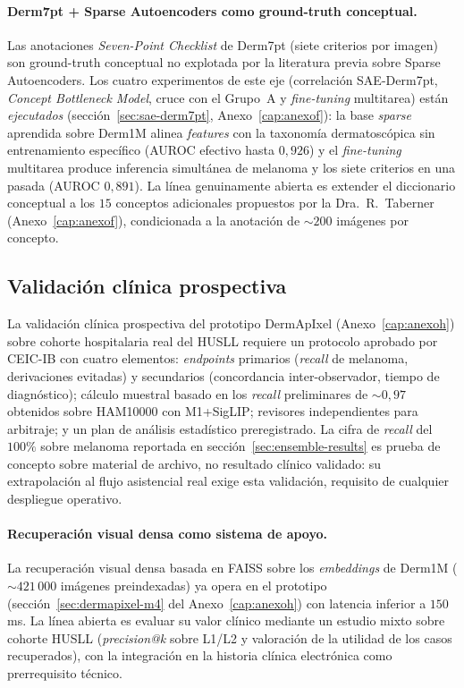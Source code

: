 \paragraph{Derm7pt + Sparse Autoencoders como ground-truth conceptual.}
\label{sec:linea-derm7pt-sae}
Las anotaciones \emph{Seven-Point Checklist} de Derm7pt (siete criterios
por imagen) son ground-truth conceptual no explotada por la literatura
previa sobre Sparse Autoencoders. Los cuatro experimentos de este eje
(correlación SAE-Derm7pt, \emph{Concept Bottleneck Model}, cruce con el
Grupo~A y \emph{fine-tuning} multitarea) están \emph{ejecutados}
(sección~\ref{sec:sae-derm7pt}, Anexo~\ref{cap:anexof}): la base
\emph{sparse} aprendida sobre Derm1M alinea \emph{features} con la
taxonomía dermatoscópica sin entrenamiento específico (AUROC efectivo
hasta $0{,}926$) y el \emph{fine-tuning} multitarea produce inferencia
simultánea de melanoma y los siete criterios en una pasada (AUROC
$0{,}891$). La línea genuinamente abierta es extender el diccionario
conceptual a los $15$ conceptos adicionales propuestos por la
Dra.~R.~Taberner (Anexo~\ref{cap:anexof}), condicionada a la anotación de
$\sim 200$ imágenes por concepto.

\subsection{Validación clínica prospectiva}
\label{sec:linea-prospectivo}

La validación clínica prospectiva del prototipo DermApIxel
(Anexo~\ref{cap:anexoh}) sobre cohorte hospitalaria real del HUSLL
requiere un protocolo aprobado por CEIC-IB con cuatro elementos:
\emph{endpoints} primarios (\emph{recall} de melanoma, derivaciones
evitadas) y secundarios (concordancia inter-observador, tiempo de
diagnóstico); cálculo muestral basado en los \emph{recall} preliminares de
$\sim 0{,}97$ obtenidos sobre HAM10000 con M1+SigLIP; revisores
independientes para arbitraje; y un plan de análisis estadístico
preregistrado. La cifra de \emph{recall} del $100\%$ sobre melanoma
reportada en sección~\ref{sec:ensemble-results} es prueba de concepto
sobre material de archivo, no resultado clínico validado: su extrapolación
al flujo asistencial real exige esta validación, requisito de cualquier
despliegue operativo.

\paragraph{Recuperación visual densa como sistema de apoyo.}
\label{sec:linea-rag}
La recuperación visual densa basada en FAISS sobre los \emph{embeddings}
de Derm1M ($\sim 421\,000$ imágenes preindexadas) ya opera en el prototipo
(sección~\ref{sec:dermapixel-m4} del Anexo~\ref{cap:anexoh}) con latencia
inferior a $150$\,ms. La línea abierta es evaluar su valor clínico
mediante un estudio mixto sobre cohorte HUSLL (\emph{precision@k} sobre
L1/L2 y valoración de la utilidad de los casos recuperados), con la
integración en la historia clínica electrónica como prerrequisito técnico.

